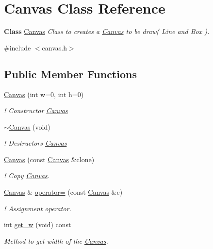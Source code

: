 \hypertarget{classCanvas}{}\section{Canvas Class Reference}
\label{classCanvas}


{\bfseries Class} \hyperlink{classCanvas}{Canvas} {\itshape Class to creates a \hyperlink{classCanvas}{Canvas} to be draw( Line and Box ).}  




{\ttfamily \#include $<$canvas.\+h$>$}

\subsection*{Public Member Functions}
\begin{DoxyCompactItemize}
\item 
\hyperlink{classCanvas_aa232b6ded8df451736a9e042e103c4e2}{Canvas} (int w=0, int h=0)
\begin{DoxyCompactList}\small\item\em ! Constructor \hyperlink{classCanvas}{Canvas} \end{DoxyCompactList}\item 
\hyperlink{classCanvas_a63c450c44bae6e3ff76a07ad0a15a750}{$\sim$\+Canvas} (void)
\begin{DoxyCompactList}\small\item\em ! Destructors \hyperlink{classCanvas}{Canvas} \end{DoxyCompactList}\item 
\hyperlink{classCanvas_afcffecf500f90749912bfe626eba9acc}{Canvas} (const \hyperlink{classCanvas}{Canvas} \&clone)
\begin{DoxyCompactList}\small\item\em ! Copy \hyperlink{classCanvas}{Canvas}. \end{DoxyCompactList}\item 
\hyperlink{classCanvas}{Canvas} \& \hyperlink{classCanvas_a2b44607cedf966c39c1e7c2b4abcb880}{operator=} (const \hyperlink{classCanvas}{Canvas} \&c)
\begin{DoxyCompactList}\small\item\em ! Assignment operator. \end{DoxyCompactList}\item 
int \hyperlink{classCanvas_a8478392f133ddaf1c9b7272a301c7898}{get\+\_\+w} (void) const
\begin{DoxyCompactList}\small\item\em Method to get width of the \hyperlink{classCanvas}{Canvas}. \end{DoxyCompactList}\item 

\end{DoxyCompactItemize}
